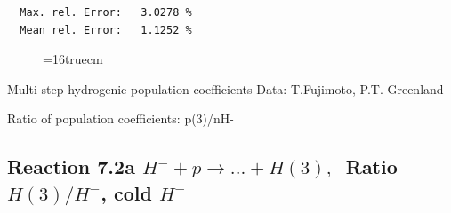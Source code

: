 \documentclass[12pt,dvips]{article}
\begin{document}
\begin{small}
\begin{verbatim}
  Max. rel. Error:   3.0278 %
  Mean rel. Error:   1.1252 %

\end{verbatim}\end{small}
\begin{figure} \label{2.2.14e}
\epsfxsize=16truecm
\end{figure}
\newpage

 Multi-step hydrogenic population coefficients
 Data: T.Fujimoto, P.T. Greenland

 Ratio of population coefficients: p(3)/nH-

\subsection{
Reaction 7.2a $ H^- + p \rightarrow ...+ H(3) , \   $
Ratio $H(3)/H^- $, cold $H^-$
}
\end{document}
